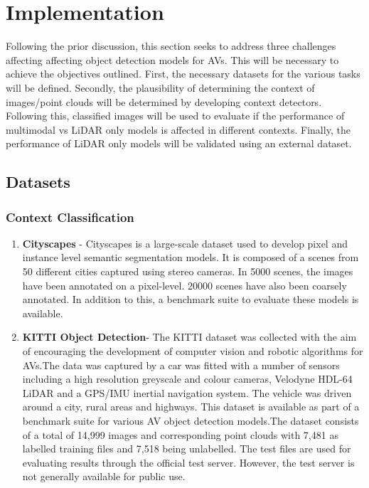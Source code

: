\let\textcircled=\pgftextcircled


\chapter{Implementation}
\label{chap:implementation}

Following the prior discussion, this section seeks to address three challenges affecting affecting object detection models for AVs. This will be necessary to achieve the objectives outlined. First, the necessary datasets for the various tasks will be defined. Secondly, the plausibility of determining the context of images/point clouds will be determined by developing context detectors. Following this, classified images will be used to evaluate if the performance of multimodal vs LiDAR only models is affected in different contexts. Finally, the performance of LiDAR only models will be validated using an external dataset. 
\section{Datasets}
\subsection{Context Classification}
\begin{enumerate}
	\item \textbf{Cityscapes} - Cityscapes is a large-scale dataset used to develop pixel and instance level semantic segmentation models. It is composed of a scenes from 50 different cities captured using stereo cameras. In 5000 scenes, the images have been annotated on a pixel-level. 20000 scenes have also been coarsely annotated. In addition to this, a benchmark suite to evaluate these models is available.  
	
	\item \textbf{KITTI Object Detection}- The KITTI dataset was collected with the aim of encouraging the development of computer vision and robotic algorithms for AVs.The data was captured by a car was fitted with a number of sensors including a high resolution greyscale and colour cameras, Velodyne HDL-64 LiDAR and a GPS/IMU inertial navigation system. The vehicle was driven around a city, rural areas and highways. This dataset is available as part of a benchmark suite for various AV object detection models.The dataset consists of  a total of 14,999 images and corresponding point clouds with  7,481 as labelled training files and 7,518 being unlabelled. The test files are used for evaluating results through the official test server. However, the test server is not generally available for public use. 
\end{enumerate}

